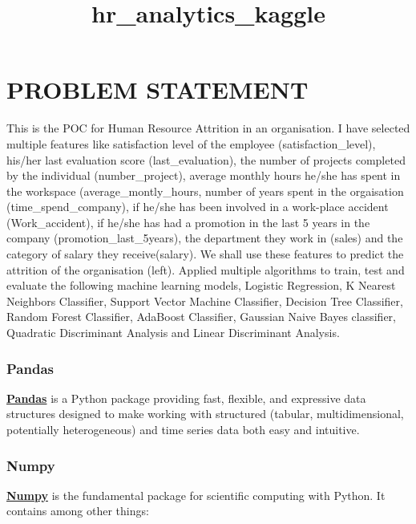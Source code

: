 \documentclass[11pt]{article}
\title{hr\_analytics\_kaggle}
\begin{document}
    
    
    \maketitle
    
    

    
    \section{PROBLEM STATEMENT}\label{problem-statement}

This is the POC for Human Resource Attrition in an organisation. I have
selected multiple features like satisfaction level of the employee
(satisfaction\_level), his/her last evaluation score (last\_evaluation),
the number of projects completed by the individual (number\_project),
average monthly hours he/she has spent in the workspace
(average\_montly\_hours, number of years spent in the orgaisation
(time\_spend\_company), if he/she has been involved in a work-place
accident (Work\_accident), if he/she has had a promotion in the last 5
years in the company (promotion\_last\_5years), the department they work
in (sales) and the category of salary they receive(salary). We shall use
these features to predict the attrition of the organisation (left).
Applied multiple algorithms to train, test and evaluate the following
machine learning models, Logistic Regression, K Nearest Neighbors
Classifier, Support Vector Machine Classifier, Decision Tree Classifier,
Random Forest Classifier, AdaBoost Classifier, Gaussian Naive Bayes
classifier, Quadratic Discriminant Analysis and Linear Discriminant
Analysis.

    \subsubsection{Pandas}\label{pandas}

\textbf{\href{https://pandas.pydata.org/pandas-docs/version/0.20/}{Pandas}}
is a Python package providing fast, flexible, and expressive data
structures designed to make working with structured (tabular,
multidimensional, potentially heterogeneous) and time series data both
easy and intuitive.

\subsubsection{Numpy}\label{numpy}

\textbf{\href{https://docs.scipy.org/doc/numpy/user/quickstart.html}{Numpy}}
is the fundamental package for scientific computing with Python. It
contains among other things:
\end{document}

